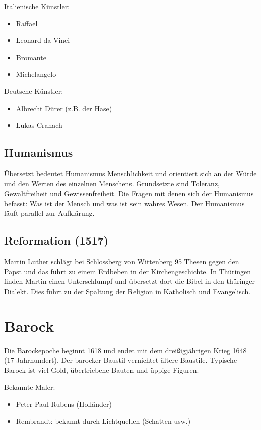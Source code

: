 \documentclass[12pt,a4paper]{article}
\begin{document}
Italienische Künstler:

\begin{itemize}
\item Raffael
\item Leonard da Vinci
\item Bromante
\item Michelangelo
\end{itemize}

Deutsche Künstler:

\begin{itemize}
\item Albrecht Dürer (z.B. der Hase)
\item Lukas Cranach
\end{itemize}

\subsection{Humanismus}
Übersetzt bedeutet Humanismus Menschlichkeit und orientiert sich an der Würde und den Werten des einzelnen Menschens.
Grundsetzte sind Toleranz, Gewaltfreiheit und Gewissenfreiheit. Die Fragen mit denen sich der Humanismus befasst: Was
ist der Mensch und was ist sein wahres Wesen. Der Humanismus läuft parallel zur Aufklärung.

\subsection{Reformation (1517)}
Martin Luther schlägt bei Schlossberg von Wittenberg 95 Thesen gegen den Papst und das führt zu einem Erdbeben in 
der Kirchengeschichte. In Thüringen finden Martin einen Unterschlumpf und übersetzt dort die Bibel in den thüringer 
Dialekt. Dies führt zu der Spaltung der Religion in Katholisch und Evangelisch.

\newpage

\section{Barock}
Die Barockepoche beginnt 1618 und endet mit dem dreißigjährigen Krieg 1648 (17 Jahrhundert).
Der barocker Baustil vernichtet ältere Baustile. Typische Barock ist viel Gold, übertriebene Bauten und üppige Figuren.

Bekannte Maler:

\begin{itemize}
\item Peter Paul Rubens (Holländer)
\item Rembrandt: bekannt durch Lichtquellen (Schatten usw.)
\end{itemize}
\end{document}
